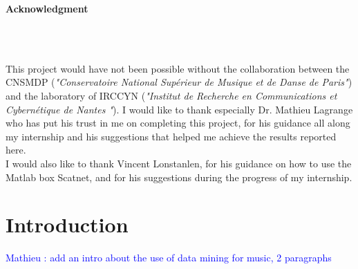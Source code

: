 \documentclass[hidelinks,12pt]{report}
\newcommand{\ml}[1]{\textcolor{blue}{ Mathieu : #1}}
\begin{document}
\begin{center}
\begin{large}
\textbf{Acknowledgment} 
\end{large}\\~\\
\end{center}
\par This project would have not been possible without the collaboration between the CNSMDP  (\textit{"Conservatoire National Supérieur de Musique et de Danse de Paris"}) and the laboratory of IRCCYN (\textit{"Institut de Recherche en Communications et Cybernétique de Nantes
"}). I would like to thank especially Dr. Mathieu Lagrange who has put his trust in me on completing this project, for his guidance all along my internship and his suggestions that helped me achieve the results reported here.\\ I would also like to thank Vincent Lonstanlen, for his guidance on how to use the Matlab box Scatnet, and for his suggestions during the progress of my internship.
\thispagestyle{empty}
\newpage
\tableofcontents
\thispagestyle{empty}
\newpage
\clearpage
\thispagestyle{empty}
\newpage
\listoffigures
\thispagestyle{empty}
\newpage
\clearpage
\setcounter{page}{1}
\noindent




\chapter{Introduction}

\ml{add an intro about the use of data mining for music, 2 paragraphs}
\end{document}
